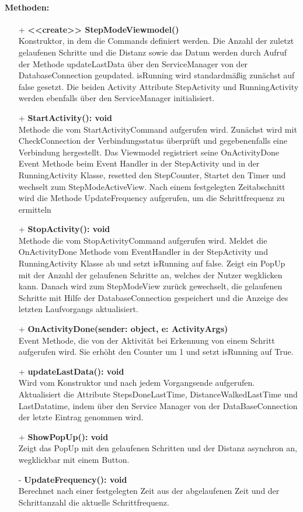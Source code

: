 \documentclass[a4paper,12pt]{article}
\begin{document}
\paragraph{Methoden:}
\begin{itemize}
	\item[+] \textbf{<<create>> StepModeViewmodel()}\\ Konstruktor, in dem die Commands definiert werden. Die Anzahl der zuletzt gelaufenen Schritte und die Distanz sowie das Datum werden durch Aufruf der Methode updateLastData über den ServiceManager von der DatabaseConnection geupdated. isRunning wird standardmäßig zunächst auf false gesetzt. Die beiden Activity Attribute StepActivity und RunningActivity werden ebenfalls über den ServiceManager initialisiert.
	\item[+] \textbf{StartActivity(): void}\\ Methode die vom StartActivityCommand aufgerufen wird. Zunächst wird mit CheckConnection der Verbindungsstatus überprüft und gegebenenfalls eine Verbindung hergestellt. Das Viewmodel registriert seine OnActivityDone Event Methode beim Event Handler in der StepActivity und in der RunningActivity Klasse, resetted den StepCounter, Startet den Timer und wechselt zum StepModeActiveView. Nach einem festgelegten Zeitabschnitt wird die Methode UpdateFrequency aufgerufen, um die Schrittfrequenz zu ermitteln
	\item[+] \textbf {StopActivity(): void}\\ Methode die vom StopActivityCommand aufgerufen wird. Meldet die OnActivityDone Methode vom EventHandler in der StepActivity und RunningActivity Klasse ab und setzt isRunning auf false. Zeigt ein PopUp mit der Anzahl der gelaufenen Schritte an, welches der Nutzer wegklicken kann. Danach wird zum StepModeView zurück gewechselt, die gelaufenen Schritte mit Hilfe der DatabaseConnection gespeichert und die Anzeige des letzten Laufvorgangs aktualisiert. 
	\item[+] \textbf{OnActivityDone(sender: object, e: ActivityArgs)} \\ Event Methode, die von der Aktivität bei Erkennung von einem Schritt aufgerufen wird. Sie erhöht den Counter um 1 und setzt isRunning auf True. 
	\item[+] \textbf{updateLastData(): void} \\ Wird vom Konstruktor und nach jedem Vorgangsende aufgerufen. Aktualisiert die Attribute StepsDoneLastTime, DistanceWalkedLastTime und LastDatatime, indem über den Service Manager von der DataBaseConnection der letzte Eintrag genommen wird. 
	\item[+] \textbf{ShowPopUp(): void} \\ Zeigt das PopUp mit den gelaufenen Schritten und der Distanz asynchron an, wegklickbar mit einem Button. 
	\item[-] \textbf{UpdateFrequency(): void} \\ Berechnet nach einer festgelegten Zeit aus der abgelaufenen Zeit und der Schrittanzahl die aktuelle Schrittfrequenz.

\end{itemize}
\end{document}
